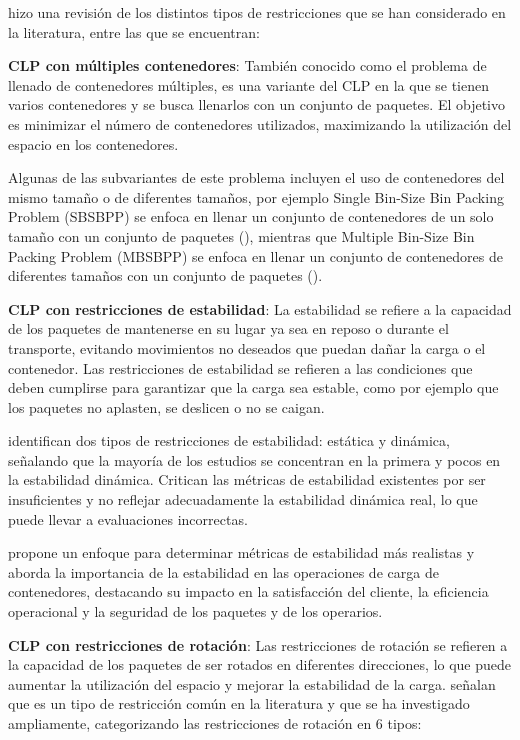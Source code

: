 \textcite{Bortfeldt20131} hizo una revisión de los distintos tipos de restricciones que se han considerado en la literatura, entre las que se encuentran:

\textbf{CLP con múltiples contenedores}: También conocido como el problema de llenado de contenedores múltiples, es una variante del CLP en la que se tienen varios contenedores y se busca llenarlos con un conjunto de paquetes. El objetivo es minimizar el número de contenedores utilizados, maximizando la utilización del espacio en los contenedores.

Algunas de las subvariantes de este problema incluyen el uso de contenedores del mismo tamaño o de diferentes tamaños, por ejemplo Single Bin-Size Bin Packing Problem (SBSBPP) se enfoca en llenar un conjunto de contenedores de un solo tamaño con un conjunto de paquetes (\textcite{ren2011priority}), mientras que Multiple Bin-Size Bin Packing Problem (MBSBPP) se enfoca en llenar un conjunto de contenedores de diferentes tamaños con un conjunto de paquetes (\textcite{zhao2016comparative}).

\textbf{CLP con restricciones de estabilidad}: La estabilidad se refiere a la capacidad de los paquetes de mantenerse en su lugar ya sea en reposo o durante el transporte, evitando movimientos no deseados que puedan dañar la carga o el contenedor. Las restricciones de estabilidad se refieren a las condiciones que deben cumplirse para garantizar que la carga sea estable, como por ejemplo que los paquetes no aplasten, se deslicen o no se caigan.

\textcite{Bortfeldt20131} identifican dos tipos de restricciones de estabilidad: estática y dinámica, señalando que la mayoría de los estudios se concentran en la primera y pocos en la estabilidad dinámica. Critican las métricas de estabilidad existentes por ser insuficientes y no reflejar adecuadamente la estabilidad dinámica real, lo que puede llevar a evaluaciones incorrectas.

\textcite{RAMOS2015480} propone un enfoque para determinar métricas de estabilidad más realistas y aborda la importancia de la estabilidad en las operaciones de carga de contenedores, destacando su impacto en la satisfacción del cliente, la eficiencia operacional y la seguridad de los paquetes y de los operarios. 


\textbf{CLP con restricciones de rotación}: Las restricciones de rotación se refieren a la capacidad de los paquetes de ser rotados en diferentes direcciones, lo que puede aumentar la utilización del espacio y mejorar la estabilidad de la carga. \textcite{Bortfeldt20131} señalan que es un tipo de restricción común en la literatura y que se ha investigado ampliamente, categorizando las restricciones de rotación en 6 tipos:

